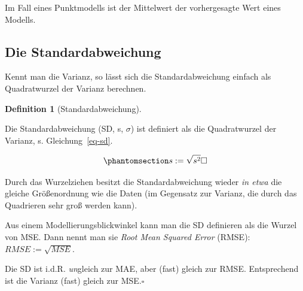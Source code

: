 \documentclass[
  letterpaper,
]{scrbook}
\theoremstyle{definition}
\theoremstyle{definition}
\newtheorem{definition}{Definition}[chapter]
\theoremstyle{definition}
\theoremstyle{remark}
\begin{document}
Im Fall eines Punktmodells ist der Mittelwert der vorhergesagte Wert
eines Modells.

\subsection{Die Standardabweichung}\label{die-standardabweichung}

Kennt man die Varianz, so lässt sich die Standardabweichung einfach als
Quadratwurzel der Varianz berechnen.

\begin{definition}[Standardabweichung]\protect\hypertarget{def-sd}{}\label{def-sd}

Die Standardabweichung (SD, s, \(\sigma\)) ist definiert als die
Quadratwurzel der Varianz, s. Gleichung~\ref{eq-sd}.

\begin{equation}\phantomsection\label{eq-sd}{s := \sqrt{s^2} \square}\end{equation}

\end{definition}

Durch das Wurzelziehen besitzt die Standardabweichung wieder \emph{in
etwa} die gleiche Größenordnung wie die Daten (im Gegensatz zur Varianz,
die durch das Quadrieren sehr groß werden kann).

Aus einem Modellierungsblickwinkel kann man die SD definieren als die
Wurzel von MSE. Dann nennt man sie \emph{Root Mean Squared Error}
(RMSE): \(RMSE := \sqrt{MSE}\).

\begin{tcolorbox}[enhanced jigsaw, colbacktitle=quarto-callout-note-color!10!white, coltitle=black, bottomrule=.15mm, rightrule=.15mm, arc=.35mm, toptitle=1mm, colframe=quarto-callout-note-color-frame, opacitybacktitle=0.6, left=2mm, leftrule=.75mm, breakable, opacityback=0, bottomtitle=1mm, titlerule=0mm, title=\textcolor{quarto-callout-note-color}{\faInfo}\hspace{0.5em}{Hinweis}, colback=white, toprule=.15mm]

Die SD ist i.d.R. \emph{un}gleich zur MAE, aber (fast) gleich zur RMSE.
Entsprechend ist die Varianz (fast) gleich zur MSE.\(\square\)

\end{tcolorbox}
\end{document}

